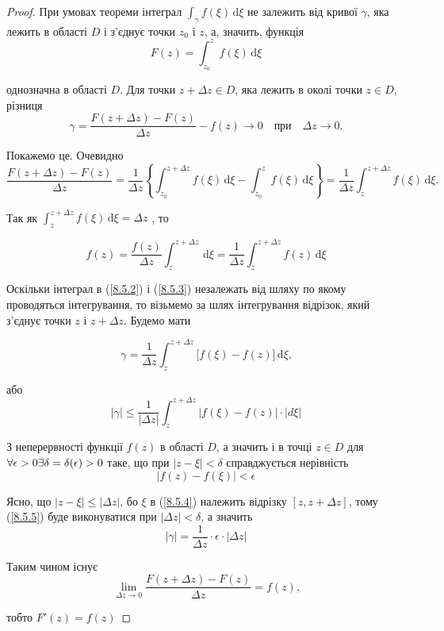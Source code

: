 \documentclass[12pt,fleqn]{article}
\theoremstyle{theorem}
\theoremstyle{proof}
\numberwithin{figure}{section}
\numberwithin{equation}{section}
\begin{document}
\begin{proof}
При умовах теореми інтеграл  \(\int_{\gamma} f(\xi) \,\mathrm{d}\xi \) не залежить від кривої $\gamma$, яка лежить в області $D$ і з'єднує точки $z_0$ і $z$, а, значить, функція
\[ F(z) = \int_{z_0}^{z} f(\xi) \,\mathrm{d}\xi \]

однозначна в області $D$. Для точки $z+ \Delta z\in D$, яка лежить в околі точки $z \in D$, різниця
\[ \gamma = \frac{F(z+\Delta z)-F(z)}{\Delta z} - f(z) \longrightarrow 0 \quad \text{при} \quad \Delta z \rightarrow 0. \]

Покажемо це. Очевидно
\begin{equation}\label{8.5.2}
\frac{F(z+\Delta z) - F(z)}{\Delta z} = \frac{1}{\Delta z} \left\{ \int_{z_0}^{z+\Delta z} f(\xi) \,\mathrm{d}\xi - \int_{z_0}^{z} f(\xi) \,\mathrm{d}\xi \right\} = \frac{1}{\Delta z} \int_{z}^{z+\Delta z} f(\xi) \,\mathrm{d}\xi.
\end{equation}

Так як $\int_{z}^{z+\Delta z} f(\xi) \,\mathrm{d}\xi = \Delta z $ , то

\begin{equation}\label{8.5.3}
f(z) = \frac{f(z)}{\Delta z} \int_{z}^{z+\Delta z} \,\mathrm{d}\xi = \frac{1}{\Delta z} \int_{z}^{z+\Delta z} f(z) \,\mathrm{d}\xi
\end{equation}

Оскільки інтеграл в (\ref{8.5.2}) і (\ref{8.5.3}) незалежать від шляху по якому проводяться інтегрування, то візьмемо за шлях інтегрування відрізок, який з'єднує точки $z$ і $z+\Delta z$. Будемо мати

\[ \gamma = \frac{1}{\Delta z} \int_{z}^{z+\Delta z}\bigg[ f(\xi) - f(z) \bigg] \,\mathrm{d}\xi \text{,} \]

або
\begin{equation}\label{8.5.4}
|\gamma| \leq \frac{1}{|\Delta z|} \int_{z}^{z+\Delta z}\bigg| f(\xi) - f(z) \bigg|\cdot|d\xi|
\end{equation}

З неперервності функції $f(z)$ в області $D$, а значить і в точці $z\in D$ для $\\ \forall\epsilon > 0 \exists \delta = \delta(\epsilon) > 0$ таке, що при $|z-\xi|<\delta$ справджується нерівність
\begin{equation}\label{8.5.5}
|f(z)-f(\xi)|<\epsilon
\end{equation}

Ясно, що $|z-\xi|\leq |\Delta z|$, бо $\xi$ в (\ref{8.5.4}) належить відрізку $[z, z+\Delta z]$, тому (\ref{8.5.5}) буде виконуватися при $|\Delta z| < \delta$, а значить
\[ |\gamma| = \frac{1}{\Delta z} \cdot \epsilon \cdot |\Delta z|  \]

Таким чином існує
\[ \lim_{\Delta z\to 0}\frac{F(z+\Delta z)-F(z)}{\Delta z}=f(z) \text{,} \]

тобто $F'(z)=f(z)$
\end{proof}
\end{document}
